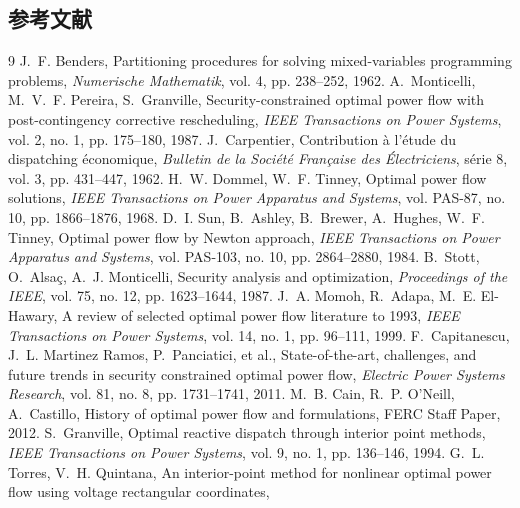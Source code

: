 \subsection{参考文献}
{\renewcommand{\section}[2]{}%
\begin{thebibliography}{9}\small
{} J.~F. Benders, Partitioning procedures for solving
mixed-variables programming problems, \emph{Numerische Mathematik}, vol. 4,
pp. 238--252, 1962.
 A.~Monticelli, M.~V.~F. Pereira, S.~Granville,
Security-constrained optimal power flow with post-contingency corrective
rescheduling, \emph{IEEE Transactions on Power Systems}, vol. 2, no. 1,
pp. 175--180, 1987.
 J.~Carpentier, Contribution \`a l'\'etude du
dispatching \'economique, \emph{Bulletin de la Soci\'et\'e Fran\c{c}aise des
\'Electriciens}, s\'erie 8, vol. 3, pp. 431--447, 1962.
 H.~W. Dommel, W.~F. Tinney, Optimal power flow
solutions, \emph{IEEE Transactions on Power Apparatus and Systems},
vol. PAS-87, no. 10, pp. 1866--1876, 1968.
 D.~I. Sun, B.~Ashley, B.~Brewer, A.~Hughes,
W.~F. Tinney, Optimal power flow by Newton approach, \emph{IEEE Transactions
on Power Apparatus and Systems}, vol. PAS-103, no. 10, pp. 2864--2880, 1984.
 B.~Stott, O.~Alsa\c{c},
A.~J. Monticelli, Security analysis and optimization, \emph{Proceedings of
the IEEE}, vol. 75, no. 12, pp. 1623--1644, 1987.
 J.~A. Momoh, R.~Adapa, M.~E. El-Hawary, A review
of selected optimal power flow literature to 1993, \emph{IEEE Transactions on
Power Systems}, vol. 14, no. 1, pp. 96--111, 1999.
 F.~Capitanescu, J.~L. Martinez Ramos,
P.~Panciatici, et al., State-of-the-art, challenges, and future trends in
security constrained optimal power flow, \emph{Electric Power Systems
Research}, vol. 81, no. 8, pp. 1731--1741, 2011.
 M.~B. Cain, R.~P. O'Neill, A.~Castillo, History
of optimal power flow and formulations, FERC Staff Paper, 2012.
 S.~Granville, Optimal reactive dispatch through
interior point methods, \emph{IEEE Transactions on Power Systems}, vol. 9,
no. 1, pp. 136--146, 1994.
 G.~L. Torres, V.~H. Quintana, An interior-point
method for nonlinear optimal power flow using voltage rectangular coordinates,

\end{thebibliography}}
